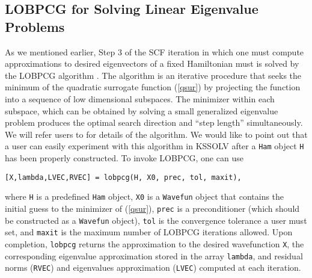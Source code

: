 \documentclass[11pt]{book}
\begin{document}
\subsection{LOBPCG for Solving Linear Eigenvalue Problems}
As we mentioned earlier, Step 3 of the SCF iteration in which 
one must compute approximations to desired eigenvectors of a fixed Hamiltonian 
must is solved by the LOBPCG algorithm \cite{lobpcg}.  The algorithm
is an iterative procedure that seeks the minimum of the quadratic
surrogate function (\ref{qsur}) by projecting the function into 
a sequence of low dimensional subspaces. The minimizer within each 
subspace, which can be obtained by solving a small generalized eigenvalue
problem produces the optimal search direction and ``step length''
simultaneously.  We will refer users to \cite{lobpcg} for details of
the algorithm.  We would like to point out that a user can easily 
experiment with this algorithm in KSSOLV after a {\tt Ham} object {\tt H} has
been properly constructed. To invoke LOBPCG, one can use
\begin{verbatim} 
[X,lambda,LVEC,RVEC] = lobpcg(H, X0, prec, tol, maxit),
\end{verbatim}
where {\tt H} is a predefined {\tt Ham} object, {\tt X0} is a
{\tt Wavefun} object that contains the initial guess to the 
minimizer of (\ref{qsur}), {\tt prec} is a preconditioner (which
should be constructed as a {\tt Wavefun} object), {\tt tol} is
the convergence tolerance a user must set, and {\tt maxit} is the
maximum number of LOBPCG iterations allowed. Upon completion, 
{\tt lobpcg} returns the approximation to the desired wavefunction 
{\tt X}, the corresponding eigenvalue approximation stored in 
the array {\tt lambda}, and residual norms ({\tt RVEC}) and 
eigenvalues approximation ({\tt LVEC}) computed at each iteration. 
\end{document}

